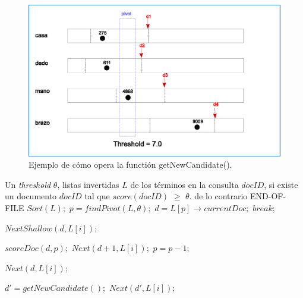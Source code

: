 \begin{figure}[!th]
\centering
\includegraphics[scale=.75]{images/get_new_candidate.eps}
\caption{Ejemplo de cómo opera la functión getNewCandidate().}
\label{fig:getNewCandidate}
\end{figure}

\begin{algorithm}[!th]
\caption{\em $BMW(\theta, L, docID): Block Max Wand$}
\label{alg:bmw}
\begin{algorithmic}[1]
\REQUIRE Un \textit{threshold} $\theta$, listas invertidas $L$ de los términos en la consulta
\ENSURE $docID$, si existe un documento $docID$ tal que $score(docID)$ $\geq$ $\theta$. de lo contrario END-OF-FILE
	\STATE $Sort(L);$
	\STATE $p = findPivot(L,\theta);$
	\STATE $d = L[p] \rightarrow currentDoc;$
  		\STATE $break;$
	\ENDIF
		
		\STATE $NextShallow(d, L[i]);$
	\ENDFOR
	
			\STATE $scoreDoc(d, p);$
				\STATE $Next(d + 1, L[i]);$
			\ENDFOR
		\ELSE
				\STATE $p = p - 1;$			
			\ENDWHILE
			
				\STATE $Next(d, L[i]);$
			\ENDFOR
			
		\ENDIF		
	\ELSE	
		\STATE $d' = getNewCandidate();$
			\STATE $Next(d', L[i]);$
		\ENDFOR
	\ENDIF
	
\ENDWHILE

\end{algorithmic}
\end{algorithm}